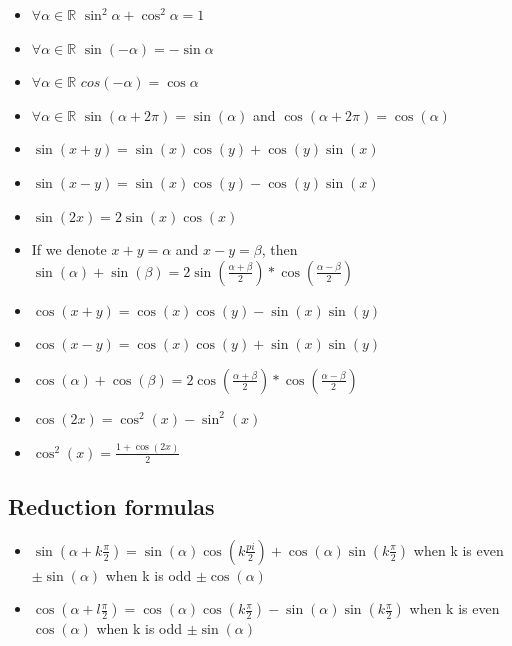 \documentclass{article}
\begin{document}
	\begin{itemize}
		\item $\forall \alpha \in \mathbb{R}$  $\sin^2\alpha + \cos^2\alpha = 1$
		\item $\forall \alpha \in \mathbb{R}$  $\sin(-\alpha) = -\sin\alpha$
		\item $\forall \alpha \in \mathbb{R}$  $cos(-\alpha) = \cos\alpha$
		\item $\forall \alpha \in \mathbb{R}$  $\sin(\alpha + 2\pi) = \sin(\alpha)$ and $\cos(\alpha + 2\pi) = \cos(\alpha)$
		\item $\sin(x+y) = \sin(x)\cos(y)  + \cos(y)\sin(x)$
		\item $\sin(x-y) = \sin(x)\cos(y)  - \cos(y)\sin(x)$
		\item $\sin(2x) = 2\sin(x)\cos(x)$
		\item If we denote $x+y=\alpha$ and $x-y=\beta$, then \\ $\sin(\alpha) + \sin(\beta) = 2\sin(\frac{\alpha + \beta}{2})*\cos(\frac{\alpha - \beta}{2})$
		\item $\cos(x+y) = \cos(x)\cos(y) - \sin(x)\sin(y)$
		\item $\cos(x-y) = \cos(x)\cos(y) + \sin(x)\sin(y)$
		\item $\cos(\alpha) + \cos(\beta) = 2\cos(\frac{\alpha + \beta}{2})*\cos(\frac{\alpha - \beta}{2})$
		\item $\cos(2x) = \cos^2(x) - \sin^2(x)$
		\item $\cos^2(x) = \frac{1 + \cos(2x)}{2}$
	\end{itemize}
	\pagebreak
	\subsection{Reduction formulas}
	\begin{itemize}
		\item $\sin(\alpha + k\frac{\pi}{2}) = \sin(\alpha)\cos(k\frac{pi}{2}) + \cos(\alpha)\sin(k\frac{\pi}{2})$
		\subitem when k is even $\pm \sin(\alpha)$
		\subitem when k is odd $\pm \cos(\alpha)$
		\item $\cos(\alpha + l\frac{\pi}{2})=\cos(\alpha)\cos(k\frac{\pi}{2}) - \sin(\alpha)\sin(k\frac{\pi}{2})$
		\subitem when k is even $\cos(\alpha)$
		\subitem when k is odd  $\pm\sin(\alpha)$
	\end{itemize}
\end{document}
